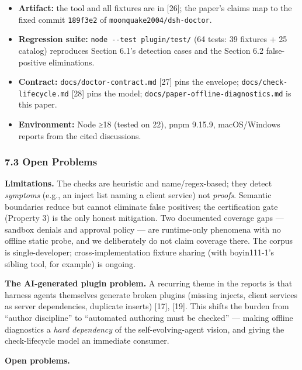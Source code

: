 \documentclass[
]{article}
\providecommand{\tightlist}{%
  \setlength{\itemsep}{0pt}\setlength{\parskip}{0pt}}
\begin{document}
\begin{itemize}
\tightlist
\item
  \textbf{Artifact:} the tool and all fixtures are in {[}26{]}; the
  paper's claims map to the fixed commit \texttt{189f3e2} of
  \texttt{moonquake2004/dsh-doctor}.
\item
  \textbf{Regression suite:} \texttt{node\ -\/-test\ plugin/test/} (64
  tests: 39 fixtures + 25 catalog) reproduces Section 6.1's detection
  cases and the Section 6.2 false-positive eliminations.
\item
  \textbf{Contract:} \texttt{docs/doctor-contract.md} {[}27{]} pins the
  envelope; \texttt{docs/check-lifecycle.md} {[}28{]} pins the model;
  \texttt{docs/paper-offline-diagnostics.md} is this paper.
\item
  \textbf{Environment:} Node ≥18 (tested on 22), pnpm 9.15.9,
  macOS/Windows reports from the cited discussions.
\end{itemize}

\subsubsection{7.3 Open Problems}\label{open-problems}

\textbf{Limitations.} The checks are heuristic and name/regex-based;
they detect \emph{symptoms} (e.g., an inject list naming a client
service) not \emph{proofs}. Semantic boundaries reduce but cannot
eliminate false positives; the certification gate (Property 3) is the
only honest mitigation. Two documented coverage gaps --- sandbox denials
and approval policy --- are runtime-only phenomena with no offline
static probe, and we deliberately do not claim coverage there. The
corpus is single-developer; cross-implementation fixture sharing (with
boyin111-1's sibling tool, for example) is ongoing.

\textbf{The AI-generated plugin problem.} A recurring theme in the
reports is that harness agents themselves generate broken plugins
(missing injects, client services as server dependencies, duplicate
inserts) {[}17{]}, {[}19{]}. This shifts the burden from ``author
discipline'' to ``automated authoring must be checked'' --- making
offline diagnostics a \emph{hard dependency} of the self-evolving-agent
vision, and giving the check-lifecycle model an immediate consumer.

\textbf{Open problems.}
\end{document}
